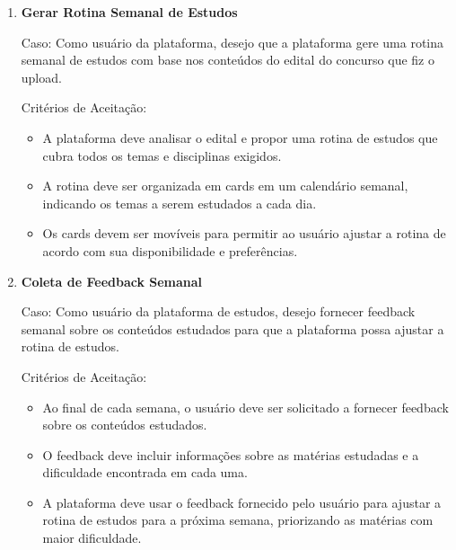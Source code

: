 \begin{enumerate}[label=\textbf{\arabic*.}]
    \item \textbf{Gerar Rotina Semanal de Estudos} \newline

    Caso: Como usuário da plataforma, desejo que a plataforma gere uma rotina semanal de estudos com base nos conteúdos do edital do concurso que fiz o upload.

   Critérios de Aceitação:
   \begin{itemize}
       \item A plataforma deve analisar o edital e propor uma rotina de estudos que cubra todos os temas e disciplinas exigidos.
       \item A rotina deve ser organizada em cards em um calendário semanal, indicando os temas a serem estudados a cada dia.
       \item Os cards devem ser movíveis para permitir ao usuário ajustar a rotina de acordo com sua disponibilidade e preferências.
   \end{itemize}

   \item \textbf{Coleta de Feedback Semanal} \newline

   Caso: Como usuário da plataforma de estudos, desejo fornecer feedback semanal sobre os conteúdos estudados para que a plataforma possa ajustar a rotina de estudos.

   Critérios de Aceitação:
   \begin{itemize}
       \item Ao final de cada semana, o usuário deve ser solicitado a fornecer feedback sobre os conteúdos estudados.
       \item O feedback deve incluir informações sobre as matérias estudadas e a dificuldade encontrada em cada uma.
       \item A plataforma deve usar o feedback fornecido pelo usuário para ajustar a rotina de estudos para a próxima semana, priorizando as matérias com maior dificuldade.
   \end{itemize}
    
\end{enumerate}

